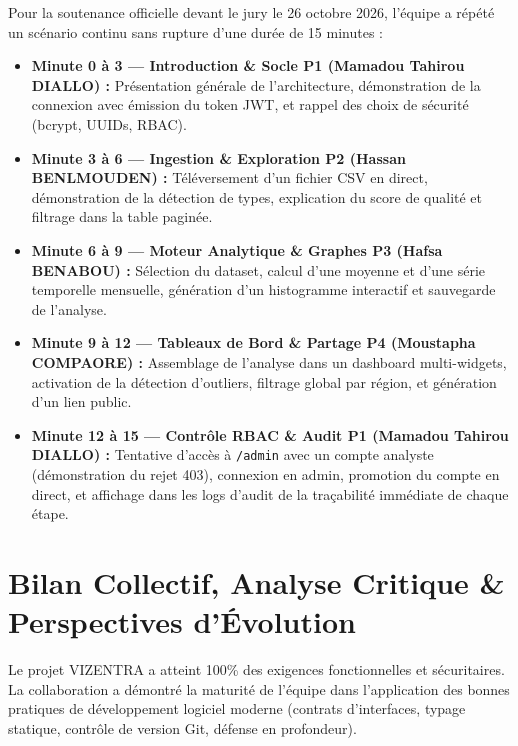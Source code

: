 \documentclass[11pt,a4paper]{article}
\begin{document}
Pour la soutenance officielle devant le jury le 26 octobre 2026, l'équipe a répété un scénario continu sans rupture d'une durée de 15 minutes :
\begin{itemize}[leftmargin=1.5cm, label=\textcolor{techblue}{\textbullet}]
    \item \textbf{Minute 0 à 3 — Introduction \& Socle P1 (Mamadou Tahirou DIALLO) :} Présentation générale de l'architecture, démonstration de la connexion avec émission du token JWT, et rappel des choix de sécurité (bcrypt, UUIDs, RBAC).
    \item \textbf{Minute 3 à 6 — Ingestion \& Exploration P2 (Hassan BENLMOUDEN) :} Téléversement d'un fichier CSV en direct, démonstration de la détection de types, explication du score de qualité et filtrage dans la table paginée.
    \item \textbf{Minute 6 à 9 — Moteur Analytique \& Graphes P3 (Hafsa BENABOU) :} Sélection du dataset, calcul d'une moyenne et d'une série temporelle mensuelle, génération d'un histogramme interactif et sauvegarde de l'analyse.
    \item \textbf{Minute 9 à 12 — Tableaux de Bord \& Partage P4 (Moustapha COMPAORE) :} Assemblage de l'analyse dans un dashboard multi-widgets, activation de la détection d'outliers, filtrage global par région, et génération d'un lien public.
    \item \textbf{Minute 12 à 15 — Contrôle RBAC \& Audit P1 (Mamadou Tahirou DIALLO) :} Tentative d'accès à \texttt{/admin} avec un compte analyste (démonstration du rejet 403), connexion en admin, promotion du compte en direct, et affichage dans les logs d'audit de la traçabilité immédiate de chaque étape.
\end{itemize}

\section{Bilan Collectif, Analyse Critique \& Perspectives d'Évolution}

Le projet VIZENTRA a atteint 100\% des exigences fonctionnelles et sécuritaires. La collaboration a démontré la maturité de l'équipe dans l'application des bonnes pratiques de développement logiciel moderne (contrats d'interfaces, typage statique, contrôle de version Git, défense en profondeur).
\end{document}
